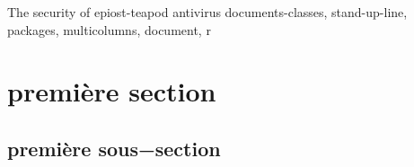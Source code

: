 \documentclass [twoside,a4,a4paper]{letter}
\begin{document}
\maketitle The security of epiost-teapod antivirus
\tableofcontents documents-classes, stand-up-line, packages, multicolumns, document, r
\section{première section}
\subsection{première sous−section}
\end{document}
